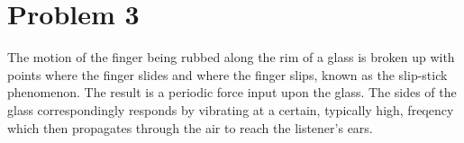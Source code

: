 \documentclass{article}
\numberwithin{equation}{section}
\begin{document}
\section*{Problem 3}

The motion of the finger being rubbed along the rim of a glass is broken up with points where the finger slides and where the finger slips, known as the slip-stick phenomenon. The result is a periodic force input upon the glass. The sides of the glass correspondingly responds by vibrating at a certain, typically high, freqency which then propagates through the air to reach the listener's ears.
\end{document}
